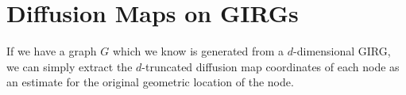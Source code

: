 









\section{Diffusion Maps on GIRGs}
If we have a graph $G$ which we know is generated from a $d$-dimensional GIRG, we can simply extract the $d$-truncated diffusion map coordinates of each node as an estimate for the original geometric location of the node.

